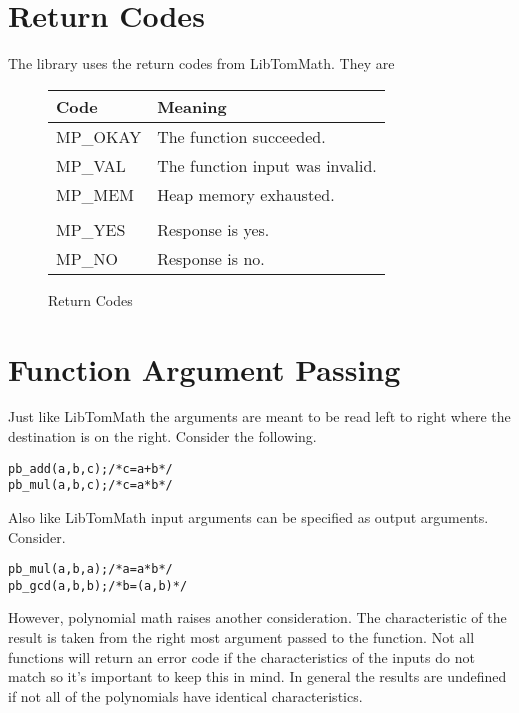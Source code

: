\documentclass[b5paper]{book}
\begin{document}
\section{Return Codes}
The library uses the return codes from LibTomMath.  They are

\begin{figure}[here!]
\begin{center}
\begin{small}
\begin{tabular}{|l|l|}
\hline \textbf{Code} & \textbf{Meaning} \\
\hline MP\_OKAY & The function succeeded. \\
\hline MP\_VAL  & The function input was invalid. \\
\hline MP\_MEM  & Heap memory exhausted. \\
\hline &\\
\hline MP\_YES  & Response is yes. \\
\hline MP\_NO   & Response is no. \\
\hline
\end{tabular}
\end{small}
\end{center}
\caption{Return Codes}
\end{figure}

\section{Function Argument Passing}
Just like LibTomMath the arguments are meant to be read left to right where the destination is on the right.  Consider
the following.

\begin{alltt}
pb_add(a, b, c);   /* c = a + b */
pb_mul(a, b, c);   /* c = a * b */
\end{alltt}

Also like LibTomMath input arguments can be specified as output arguments.  Consider.

\begin{alltt}
pb_mul(a, b, a);   /* a = a * b */
pb_gcd(a, b, b);   /* b = (a, b) */
\end{alltt}

However, polynomial math raises another consideration.  The characteristic of the result is taken from the right most
argument passed to the function.  Not all functions will return an error code if the characteristics of the inputs
do not match so it's important to keep this in mind.  In general the results are undefined if not all of the polynomials
have identical characteristics.
\end{document}
